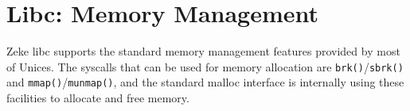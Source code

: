 \chapter{Libc: Memory Management}

Zeke libc supports the standard memory management features provided by
most of Unices. The syscalls that can be used for memory allocation are
\verb+brk()+/\verb+sbrk()+ and \verb+mmap()+/\verb+munmap()+, and the
standard malloc interface is internally using these facilities to allocate
and free memory.
